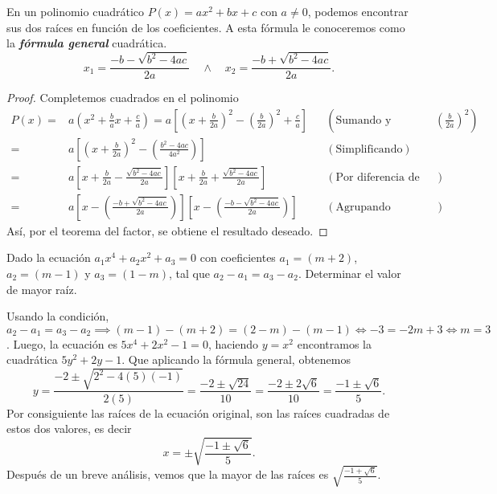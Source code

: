 En un polinomio cuadrático $P(x) = ax^2 + bx + c$ con $a \neq 0$, podemos encontrar sus dos raíces en función de los coeficientes.
A esta fórmula le conoceremos como la \textbf{\emph{fórmula general}} cuadrática.
\[
    x_1 = \frac{-b - \sqrt {b^2 - 4ac}}{2a}\quad\land\quad x_2 = \frac{-b + \sqrt {b^2 - 4ac}}{2a}.
\]
\begin{proof}
    Completemos cuadrados en el polinomio
    \begin{align*}
        P(x) =& a \left( x^2 + \frac{b}{a}x + \frac{c}{a} \right) = a \left[ \left( x + \frac{b}{2a} \right)^2 - \left( \frac{b}{2a} \right)^2 + \frac{c}{a} \right] && (\text{Sumando y restando} \textstyle\left( \frac{b}{2a} \right)^2)\\
        =& a \left[ \left( x + \frac{b}{2a} \right)^2 - \left( \frac{b^2 - 4ac}{4a^2}\right) \right]  && (\text{Simplificando})\\
        =& a \left[ x + \frac{b}{2a} - \frac{\sqrt {b^2 - 4ac}}{2a}\right]\left[ x + \frac{b}{2a} + \frac{\sqrt {b^2 - 4ac}}{2a}\right]  && (\text{Por diferencia de cuadrados})\\
        =& a \left[ x - \left( \frac{-b + \sqrt {b^2 - 4ac}}{2a} \right) \right]\left[ x - \left( \frac{-b - \sqrt {b^2 - 4ac}}{2a} \right) \right] && (\text{Agrupando coeficientes})
    \end{align*}
    Así, por el teorema del factor, se obtiene el resultado deseado.
\end{proof}

\begin{example}
    Dado la ecuación $a_1 x^4 + a_2 x^2 + a_3 = 0$ con coeficientes $a_1 = (m + 2)$, $a_2 = (m - 1)$ y $a_3 = (1 - m)$, tal que $a_2 - a_1 = a_3 - a_2$.
    Determinar el valor de mayor raíz.
\end{example}
\begin{solution}
    Usando la condición, $a_2 - a_1 = a_3 - a_2 \implies (m - 1) - (m + 2) = (2 - m) - (m - 1) \iff -3 = -2m + 3 \iff m = 3$.
    Luego, la ecuación es $5x^4 + 2x^2 - 1 = 0$, haciendo $y = x^2$ encontramos la cuadrática $5y^2 + 2y - 1$.
    Que aplicando la fórmula general, obtenemos
    \[
        y = \frac{-2 \pm \sqrt{2^2 - 4(5)(-1)}}{2(5)} = \frac{-2 \pm \sqrt{24}}{10} = \frac{-2 \pm 2\sqrt{6}}{10} = \frac{-1 \pm \sqrt{6}}{5}.
    \]
    Por consiguiente las raíces de la ecuación original, son las raíces cuadradas de estos dos valores, es decir
    \[
        x = \pm \sqrt {\frac{-1 \pm \sqrt{6}}{5}}.
    \]
    Después de un breve análisis, vemos que la mayor de las raíces es $\sqrt {\frac{-1 + \sqrt{6}}{5}}$.
\end{solution}

